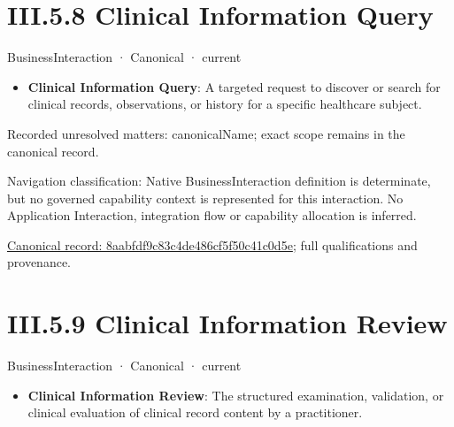 \section*{III.5.8 Clinical Information Query}
\label{navigation:III.5.8}

\label{element:8aabfdf9c83c4de486cf5f50c41c0d5e}
{\small BusinessInteraction · Canonical · current}\par

\begin{itemize}


\item \textbf{Clinical Information Query}: A targeted request to discover or search for clinical records, observations, or history for a specific healthcare subject.

\end{itemize}

{\small Recorded unresolved matters: canonicalName; exact scope remains in the canonical record.}\par
{\small Navigation classification: Native BusinessInteraction definition is determinate, but no governed capability context is represented for this interaction. No Application Interaction, integration flow or capability allocation is inferred.}\par
{\footnotesize \href{../../../../../../../continuum/business/business-interaction/8aabfdf9c83c4de486cf5f50c41c0d5e.md}{Canonical record: 8aabfdf9c83c4de486cf5f50c41c0d5e}; full qualifications and provenance.}\par
\section*{III.5.9 Clinical Information Review}
\label{navigation:III.5.9}

\label{element:06dbfdb6b8a84bd29f67ca955ba23006}
{\small BusinessInteraction · Canonical · current}\par

\begin{itemize}


\item \textbf{Clinical Information Review}: The structured examination, validation, or clinical evaluation of clinical record content by a practitioner.

\end{itemize}

